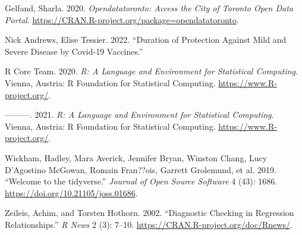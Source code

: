 \documentclass[
]{article}
\newlength{\cslhangindent}
\newlength{\cslentryspacingunit} %
\newenvironment{CSLReferences}[2] %
 {%
  \setlength{\parindent}{0pt}
  \ifodd #1
  \let\oldpar\par
  \def\par{\hangindent=\cslhangindent\oldpar}
  \fi
  \setlength{\parskip}{#2\cslentryspacingunit}
 }%
 {}
\begin{document}
\hypertarget{refs}{}
\begin{CSLReferences}{1}{0}
\leavevmode{}%
Gelfand, Sharla. 2020. \emph{Opendatatoronto: Access the City of Toronto Open Data Portal}. \url{https://CRAN.R-project.org/package=opendatatoronto}.

\leavevmode{}%
Nick Andrews, Elise Tessier. 2022. {``Duration of Protection Against Mild and Severe Disease by Covid-19 Vaccines.''}

\leavevmode{}%
R Core Team. 2020. \emph{R: A Language and Environment for Statistical Computing}. Vienna, Austria: R Foundation for Statistical Computing. \url{https://www.R-project.org/}.

\leavevmode{}%
---------. 2021. \emph{R: A Language and Environment for Statistical Computing}. Vienna, Austria: R Foundation for Statistical Computing. \url{https://www.R-project.org/}.

\leavevmode{}%
Wickham, Hadley, Mara Averick, Jennifer Bryan, Winston Chang, Lucy D'Agostino McGowan, Romain Fran??ois, Garrett Grolemund, et al. 2019. {``Welcome to the {tidyverse}.''} \emph{Journal of Open Source Software} 4 (43): 1686. \url{https://doi.org/10.21105/joss.01686}.

\leavevmode{}%
Zeileis, Achim, and Torsten Hothorn. 2002. {``Diagnostic Checking in Regression Relationships.''} \emph{R News} 2 (3): 7--10. \url{https://CRAN.R-project.org/doc/Rnews/}.

\end{CSLReferences}
\end{document}
